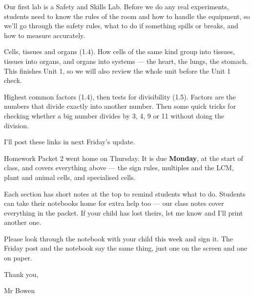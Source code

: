 \documentclass[11pt]{article}
\begin{document}
\begin{annbody}
\vspace{4pt}
Our first lab is a Safety and Skills Lab. Before we do any real experiments,
students need to know the rules of the room and how to handle the equipment, so
we'll go through the safety rules, what to do if something spills or breaks, and
how to measure accurately.


Cells, tissues and organs (1.4). How cells of the same kind group into tissues,
tissues into organs, and organs into systems --- the heart, the lungs, the
stomach. This finishes Unit 1, so we will also review the whole unit before the
Unit 1 check.

Highest common factors (1.4), then tests for divisibility (1.5). Factors are the
numbers that divide exactly into another number. Then some quick tricks for
checking whether a big number divides by 3, 4, 9 or 11 without doing the
division.

\vspace{5pt}
I'll post these links in next Friday's update.


Homework Packet 2 went home on Thursday. It is due \textbf{Monday}, at the start
of class, and covers everything above --- the sign rules, multiples and the LCM,
plant and animal cells, and specialised cells.
\par\vspace{4pt}
\par\vspace{4pt}
Each section has short notes at the top to remind students what to do. Students
can take their notebooks home for extra help too --- our class notes cover
everything in the packet. If your child has lost theirs, let me know and I'll
print another one.


Please look through the notebook with your child this week and sign it. The
Friday post and the notebook say the same thing, just one on the screen and one
on paper.

\vspace{8pt}
Thank you,\par
Mr Bowen

\end{annbody}
\end{document}
